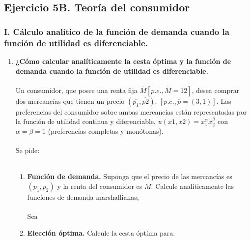 \subsection*{\center Ejercicio 5B. Teoría del consumidor}
\vspace{1cm}

\subsubsection*{\center I. Cálculo analítico de la función de demanda cuando la función de utilidad es diferenciable.}
\vspace{.5cm}


\begin{enumerate}

    \item \textbf{¿Cómo calcular analíticamente la cesta óptima y la función de demanda cuando la función de utilidad es diferenciable.}\\\\
	Un consumidor, que posee una renta fija $\overline{M}[p.e., \overline{M} = 12]$, desea comprar dos mercancías que tienen un precio $(\overline{p_1} , \overline{p2})$. $[p.e., \overline{p} = (3, 1)]$. Las preferencias del consumidor sobre ambas mercancías están  representadas por la función de utilidad continua y diferenciable, $u(x1, x2) = x_1^\alpha x_2^\beta $ con $\alpha = \beta = 1$ (preferencias completas y monótonas).\\\\
Se pide:\\\\

    \begin{enumerate}[\bfseries a)]

	\item \textbf{Función de demanda.} Suponga que el precio de las mercancías es $(p_1, p_2)$ y la renta del consumidor es $M$. Calcule analíticamente las funciones de demanda marshallianas;\\\\
	    Sea 

	\item \textbf{Elección óptima.} Calcule la cesta óptima para:\\\\ 

	    \begin{enumerate}[\bfseries b1)]


\end{enumerate}
\end{enumerate}
\end{enumerate}
